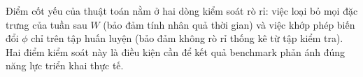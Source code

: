 Điểm cốt yếu của thuật toán nằm ở hai dòng kiểm soát rò rỉ: việc loại bỏ mọi đặc trưng của tuần sau $W$ (bảo đảm tính nhân quả thời gian) và việc khớp phép biến đổi $\phi$ chỉ trên tập huấn luyện (bảo đảm không rò rỉ thống kê từ tập kiểm tra). Hai điểm kiểm soát này là điều kiện cần để kết quả benchmark phản ánh đúng năng lực triển khai thực tế.



\clearpage
